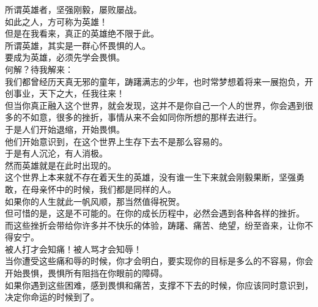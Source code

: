 \begin{multicols}{\theparacolNo}
所谓英雄者，坚强刚毅，屡败屡战。\\

如此之人，方可称为英雄！\\

但是在我看来，真正的英雄绝不限于此。\\

所谓英雄，其实是一群心怀畏惧的人。\\

要成为英雄，必须先学会畏惧。\\

何解？待我解来：\\

我们都曾经历天真无邪的童年，踌躇满志的少年，也时常梦想着将来一展抱负，开创事业，天下之大，任我往来！\\

但当你真正融入这个世界，就会发现，这并不是你自己一个人的世界，你会遇到很多的不如意，很多的挫折，事情从来不会如同你所想的那样去进行。\\

于是人们开始退缩，开始畏惧。\\

他们开始意识到，在这个世界上生存下去不是那么容易的。\\

于是有人沉沦，有人消极。\\

然而英雄就是在此时出现的。\\

这个世界上本来就不存在着天生的英雄，没有谁一生下来就会刚毅果断，坚强勇敢，在母亲怀中的时候，我们都是同样的人。\\

如果你的人生就此一帆风顺，那当然值得祝贺。\\

但可惜的是，这是不可能的。在你的成长历程中，必然会遇到各种各样的挫折。\\

而这些挫折会带给你许多并不快乐的体验，踌躇、痛苦、绝望，纷至沓来，让你不得安宁。\\

被人打才会知痛！被人骂才会知辱！\\

当你遭受这些痛和辱的时候，你才会明白，要实现你的目标是多么的不容易，你会开始畏惧，畏惧所有阻挡在你眼前的障碍。\\

如果你遇到这些困难，感到畏惧和痛苦，支撑不下去的时候，你应该同时意识到，决定你命运的时候到了。\\


\end{multicols}
